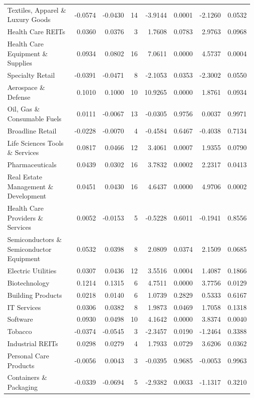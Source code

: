 \begin{table}
\begin{tabular}{lrrrrrrr}
Textiles, Apparel \& Luxury Goods & -0.0574 & -0.0430 & 14 & -3.9144 & 0.0001 & -2.1260 & 0.0532 \\
Health Care REITs & 0.0360 & 0.0376 & 3 & 1.7608 & 0.0783 & 2.9763 & 0.0968 \\
Health Care Equipment \& Supplies & 0.0934 & 0.0802 & 16 & 7.0611 & 0.0000 & 4.5737 & 0.0004 \\
Specialty Retail & -0.0391 & -0.0471 & 8 & -2.1053 & 0.0353 & -2.3002 & 0.0550 \\
Aerospace \& Defense & 0.1010 & 0.1000 & 10 & 10.9265 & 0.0000 & 1.8761 & 0.0934 \\
Oil, Gas \& Consumable Fuels & 0.0111 & -0.0067 & 13 & -0.0305 & 0.9756 & 0.0037 & 0.9971 \\
Broadline Retail & -0.0228 & -0.0070 & 4 & -0.4584 & 0.6467 & -0.4038 & 0.7134 \\
Life Sciences Tools \& Services & 0.0817 & 0.0466 & 12 & 3.4061 & 0.0007 & 1.9355 & 0.0790 \\
Pharmaceuticals & 0.0439 & 0.0302 & 16 & 3.7832 & 0.0002 & 2.2317 & 0.0413 \\
Real Estate Management \& Development & 0.0451 & 0.0430 & 16 & 4.6437 & 0.0000 & 4.9706 & 0.0002 \\
Health Care Providers \& Services & 0.0052 & -0.0153 & 5 & -0.5228 & 0.6011 & -0.1941 & 0.8556 \\
Semiconductors \& Semiconductor Equipment & 0.0532 & 0.0398 & 8 & 2.0809 & 0.0374 & 2.1509 & 0.0685 \\
Electric Utilities & 0.0307 & 0.0436 & 12 & 3.5516 & 0.0004 & 1.4087 & 0.1866 \\
Biotechnology & 0.1214 & 0.1315 & 6 & 4.7511 & 0.0000 & 3.7756 & 0.0129 \\
Building Products & 0.0218 & 0.0140 & 6 & 1.0739 & 0.2829 & 0.5333 & 0.6167 \\
IT Services & 0.0306 & 0.0382 & 8 & 1.9873 & 0.0469 & 1.7058 & 0.1318 \\
Software & 0.0930 & 0.0498 & 10 & 4.1642 & 0.0000 & 3.8374 & 0.0040 \\
Tobacco & -0.0374 & -0.0545 & 3 & -2.3457 & 0.0190 & -1.2464 & 0.3388 \\
Industrial REITs & 0.0298 & 0.0279 & 4 & 1.7933 & 0.0729 & 3.6206 & 0.0362 \\
Personal Care Products & -0.0056 & 0.0043 & 3 & -0.0395 & 0.9685 & -0.0053 & 0.9963 \\
Containers \& Packaging & -0.0339 & -0.0694 & 5 & -2.9382 & 0.0033 & -1.1317 & 0.3210 \\

\end{tabular}
\end{table}

